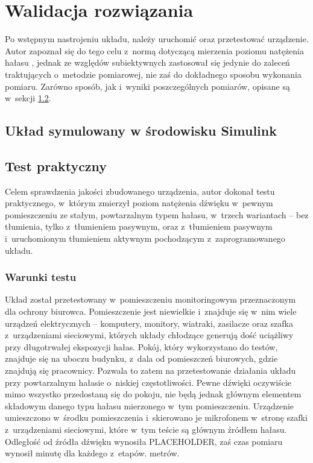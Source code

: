 \chapter{Walidacja rozwiązania}
\label{cha:tests}
Po wstępnym nastrojeniu układu, należy uruchomić oraz przetestować urządzenie. Autor zapoznał się do tego celu z~normą dotyczącą mierzenia poziomu natężenia hałasu \cite{test_norm}, jednak ze względów subiektywnych zastosował się jedynie do zaleceń traktujących o~metodzie pomiarowej, nie zaś do dokładnego sposobu wykonania pomiaru. Zarówno sposób, jak i~wyniki poszczególnych pomiarów, opisane są w~sekcji \ref{sec:practical_test}.
\section{Układ symulowany w środowisku Simulink}

\section{Test praktyczny}
\label{sec:practical_test}
Celem sprawdzenia jakości zbudowanego urządzenia, autor dokonał testu praktycznego, w~którym zmierzył poziom natężenia dźwięku w~pewnym pomieszczeniu ze stałym, powtarzalnym typem hałasu, w~trzech wariantach -- bez tłumienia, tylko z~tłumieniem pasywnym, oraz z~tłumieniem pasywnym i~uruchomionym tłumieniem aktywnym pochodzącym z~zaprogramowanego układu.
\subsection{Warunki testu}
\label{subsec:circumstances}
Układ został przetestowany w~pomieszczeniu monitoringowym przeznaczonym dla ochrony biurowca. Pomieszczenie jest niewielkie i~znajduje się w~nim wiele urządzeń elektrycznych -- komputery, monitory, wiatraki, zasilacze oraz szafka z~urządzeniami sieciowymi, których układy chłodzące generują dość uciążliwy przy długotrwałej ekspozycji hałas. Pokój, który wykorzystano do testów, znajduje się na uboczu budynku, z~dala od pomieszczeń biurowych, gdzie znajdują się pracownicy. Pozwala to zatem na przetestowanie działania układu przy powtarzalnym hałasie o~niskiej częstotliwości. Pewne dźwięki oczywiście mimo wszystko przedostaną się do pokoju, nie będą jednak głównym elementem składowym danego typu hałasu mierzonego w~tym pomieszczeniu. Urządzenie umieszczono w~środku pomieszczenia i~skierowano je mikrofonem w~stronę szafki z~urządzeniami sieciowymi, które w~tym teście są głównym źródłem hałasu. Odległość od źródła dźwięku wynosiła PLACEHOLDER, %
zaś czas pomiaru wynosił minutę dla każdego z~etapów.
metrów.
